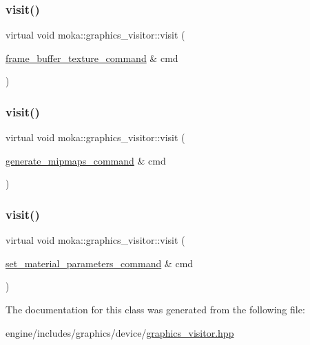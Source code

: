 \mbox{\label{classmoka_1_1graphics__visitor_a38cb82e793a045d26e0664fdd7fa66d4}} 
\subsubsection{\texorpdfstring{visit()}{visit()}\hspace{0.1cm}{\footnotesize\ttfamily [8/10]}}
{\footnotesize\ttfamily virtual void moka\+::graphics\+\_\+visitor\+::visit (\begin{DoxyParamCaption}\item[{\mbox{\hyperlink{classmoka_1_1frame__buffer__texture__command}{frame\+\_\+buffer\+\_\+texture\+\_\+command}} \&}]{cmd }\end{DoxyParamCaption})\hspace{0.3cm}{\ttfamily [pure virtual]}}

\mbox{\label{classmoka_1_1graphics__visitor_a008fb998e951132faef8af59e28d1ebf}} 
\subsubsection{\texorpdfstring{visit()}{visit()}\hspace{0.1cm}{\footnotesize\ttfamily [9/10]}}
{\footnotesize\ttfamily virtual void moka\+::graphics\+\_\+visitor\+::visit (\begin{DoxyParamCaption}\item[{\mbox{\hyperlink{classmoka_1_1generate__mipmaps__command}{generate\+\_\+mipmaps\+\_\+command}} \&}]{cmd }\end{DoxyParamCaption})\hspace{0.3cm}{\ttfamily [pure virtual]}}

\mbox{\label{classmoka_1_1graphics__visitor_aa197ab3921b6fb35cbe2524e6dfef54a}} 
\subsubsection{\texorpdfstring{visit()}{visit()}\hspace{0.1cm}{\footnotesize\ttfamily [10/10]}}
{\footnotesize\ttfamily virtual void moka\+::graphics\+\_\+visitor\+::visit (\begin{DoxyParamCaption}\item[{\mbox{\hyperlink{classmoka_1_1set__material__parameters__command}{set\+\_\+material\+\_\+parameters\+\_\+command}} \&}]{cmd }\end{DoxyParamCaption})\hspace{0.3cm}{\ttfamily [pure virtual]}}



The documentation for this class was generated from the following file\+:\begin{DoxyCompactItemize}
\item 
engine/includes/graphics/device/\mbox{\hyperlink{graphics__visitor_8hpp}{graphics\+\_\+visitor.\+hpp}}\end{DoxyCompactItemize}
